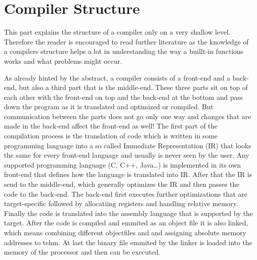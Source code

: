 \chapter{Compiler Structure}
\label{chapter:compiler structure}

This part explains the structure of a compiler only on a very shallow level. Therefore the reader is encouraged to read further literature as the knowledge of a compilers structure helps a lot in understanding the way a buillt-in functions works and what problems might occur.

As already hinted by the abstract, a compiler consists of a front-end and a back-end, but also a third part that is the middle-end. These three parts sit on top of each other with the front-end on top and the back-end at the bottom and pass down the program as it is translated and optimized or compiled. But communication between the parts does not go only one way and changes that are made in the back-end affect the front-end as well!
The first part of the compilation process is the translation of code which is written in some programming language into a so called Immediate Representation (IR) that looks the same for every front-end language and usually is never seen by the user. Any supported programming language (C, C++, Java…) is implemented in its own front-end that defines how the language is translated into IR. After that the IR is send to the middle-end, which generally optimizes the IR and then passes the code to the back-end. The back-end first executes further optimizations that are target-specific followed by allocatiing registers and handling relative memory. Finally the code is translated into the assembly language that is supported by the target.
After the code is compiled and emmited as an object file it is also linked, which means combining different objectfiles and and assigning absolute memory addresses to tehm. At last the binary file emmited by the linker is loaded into the memory of the processor and then can be executed.

